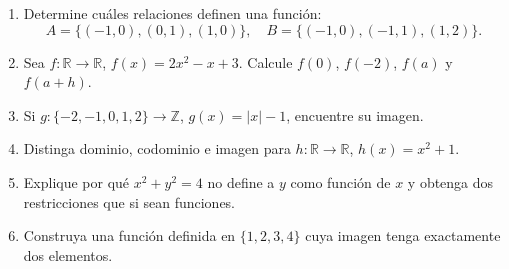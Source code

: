 \documentclass[10pt,a5paper]{article}
\newif\ifmostrarSoluciones
\begin{document}
\begin{ejercicios}
\begin{enumerate}
  \item Determine cuáles relaciones definen una función:
  \[
  A=\{(-1,0),(0,1),(1,0)\},\quad
  B=\{(-1,0),(-1,1),(1,2)\}.
  \]
  \item Sea $f:\mathbb{R}\to\mathbb{R}$, $f(x)=2x^2-x+3$. Calcule $f(0)$, $f(-2)$, $f(a)$ y $f(a+h)$.
  \item Si $g:\{-2,-1,0,1,2\}\to\mathbb{Z}$, $g(x)=|x|-1$, encuentre su imagen.
  \item Distinga dominio, codominio e imagen para $h:\mathbb{R}\to\mathbb{R}$, $h(x)=x^2+1$.
  \item Explique por qué $x^2+y^2=4$ no define a $y$ como función de $x$ y obtenga dos restricciones que si sean funciones.
  \item Construya una función definida en $\{1,2,3,4\}$ cuya imagen tenga exactamente dos elementos.
\end{enumerate}
\end{ejercicios}

\ifmostrarSoluciones
\begin{solucion}[de los ejercicios]
\begin{enumerate}
  \item $A$ es función; $B$ no lo es porque $-1$ posee dos imágenes.
  \item $f(0)=3$, $f(-2)=13$, $f(a)=2a^2-a+3$ y
  \[
  f(a+h)=2a^2+4ah+2h^2-a-h+3.
  \]
  \item $\operatorname{Im}(g)=\{-1,0,1\}$.
  \item Dominio $\mathbb{R}$, codominio $\mathbb{R}$ e imagen $[1,\infty)$.
  \item $y=\pm\sqrt{4-x^2}$, $-2\leq x\leq2$, define los semicírculos superior e inferior.
  \item Por ejemplo, $f(1)=f(2)=0$ y $f(3)=f(4)=1$.
\end{enumerate}
\end{solucion}
\fi

\end{document}
